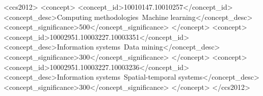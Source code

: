 \documentclass[sigconf,review,anonymous]{acmart}
\begin{document}
\begin{CCSXML}
<ccs2012>
   <concept>
       <concept_id>10010147.10010257</concept_id>
       <concept_desc>Computing methodologies~Machine learning</concept_desc>
       <concept_significance>500</concept_significance>
   </concept>
   <concept>
       <concept_id>10002951.10003227.10003351</concept_id>
       <concept_desc>Information systems~Data mining</concept_desc>
       <concept_significance>300</concept_significance>
   </concept>
   <concept>
       <concept_id>10002951.10003227.10003236</concept_id>
       <concept_desc>Information systems~Spatial-temporal systems</concept_desc>
       <concept_significance>300</concept_significance>
   </concept>
</ccs2012>
\end{CCSXML}
\end{document}
